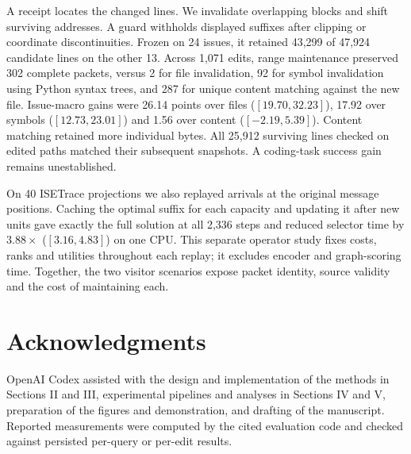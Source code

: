 \documentclass[conference]{IEEEtran}
\begin{document}
A receipt locates the changed lines. We invalidate overlapping blocks and shift surviving addresses. A guard withholds displayed suffixes after clipping or coordinate discontinuities. Frozen on 24 issues, it retained 43,299 of 47,924 candidate lines on the other 13. Across 1,071 edits, range maintenance preserved 302 complete packets, versus 2 for file invalidation, 92 for symbol invalidation using Python syntax trees, and 287 for unique content matching against the new file. Issue-macro gains were 26.14 points over files ($[19.70,32.23]$), 17.92 over symbols ($[12.73,23.01]$) and 1.56 over content ($[-2.19,5.39]$). Content matching retained more individual bytes. All 25,912 surviving lines checked on edited paths matched their subsequent snapshots. A coding-task success gain remains unestablished.

On 40 ISETrace projections we also replayed arrivals at the original message positions. Caching the optimal suffix for each capacity and updating it after new units gave exactly the full solution at all 2,336 steps and reduced selector time by $3.88\times$ ($[3.16,4.83]$) on one CPU. This separate operator study fixes costs, ranks and utilities throughout each replay; it excludes encoder and graph-scoring time. Together, the two visitor scenarios expose packet identity, source validity and the cost of maintaining each.

\section*{Acknowledgments}
OpenAI Codex assisted with the design and implementation of the methods in Sections II and III, experimental pipelines and analyses in Sections IV and V, preparation of the figures and demonstration, and drafting of the manuscript. Reported measurements were computed by the cited evaluation code and checked against persisted per-query or per-edit results.



\end{document}
